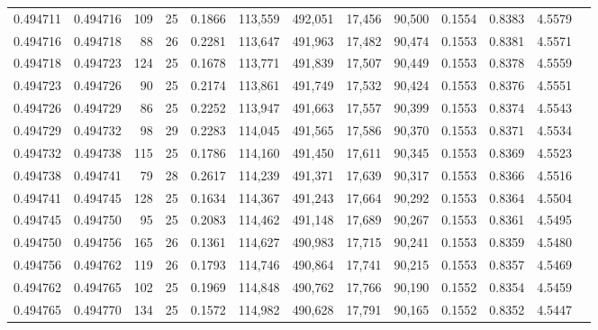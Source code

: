 \begin{tabular}{rrrrrrrrrrrrr}
0.494711 & 0.494716 & 109 &  25 &                                     0.1866 & 113,559 & 492,051 &  17,456 &  90,500 & 0.1554 & 0.8383 & 4.5579 \\
0.494716 & 0.494718 &  88 &  26 &                                     0.2281 & 113,647 & 491,963 &  17,482 &  90,474 & 0.1553 & 0.8381 & 4.5571 \\
0.494718 & 0.494723 & 124 &  25 &                                     0.1678 & 113,771 & 491,839 &  17,507 &  90,449 & 0.1553 & 0.8378 & 4.5559 \\
0.494723 & 0.494726 &  90 &  25 &                                     0.2174 & 113,861 & 491,749 &  17,532 &  90,424 & 0.1553 & 0.8376 & 4.5551 \\
0.494726 & 0.494729 &  86 &  25 &                                     0.2252 & 113,947 & 491,663 &  17,557 &  90,399 & 0.1553 & 0.8374 & 4.5543 \\
0.494729 & 0.494732 &  98 &  29 &                                     0.2283 & 114,045 & 491,565 &  17,586 &  90,370 & 0.1553 & 0.8371 & 4.5534 \\
0.494732 & 0.494738 & 115 &  25 &                                     0.1786 & 114,160 & 491,450 &  17,611 &  90,345 & 0.1553 & 0.8369 & 4.5523 \\
0.494738 & 0.494741 &  79 &  28 &                                     0.2617 & 114,239 & 491,371 &  17,639 &  90,317 & 0.1553 & 0.8366 & 4.5516 \\
0.494741 & 0.494745 & 128 &  25 &                                     0.1634 & 114,367 & 491,243 &  17,664 &  90,292 & 0.1553 & 0.8364 & 4.5504 \\
0.494745 & 0.494750 &  95 &  25 &                                     0.2083 & 114,462 & 491,148 &  17,689 &  90,267 & 0.1553 & 0.8361 & 4.5495 \\
0.494750 & 0.494756 & 165 &  26 &                                     0.1361 & 114,627 & 490,983 &  17,715 &  90,241 & 0.1553 & 0.8359 & 4.5480 \\
0.494756 & 0.494762 & 119 &  26 &                                     0.1793 & 114,746 & 490,864 &  17,741 &  90,215 & 0.1553 & 0.8357 & 4.5469 \\
0.494762 & 0.494765 & 102 &  25 &                                     0.1969 & 114,848 & 490,762 &  17,766 &  90,190 & 0.1552 & 0.8354 & 4.5459 \\
0.494765 & 0.494770 & 134 &  25 &                                     0.1572 & 114,982 & 490,628 &  17,791 &  90,165 & 0.1552 & 0.8352 & 4.5447 \\

\end{tabular}
